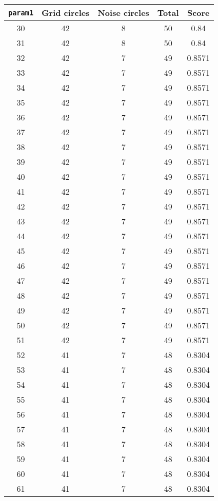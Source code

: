 \documentclass[letterpaper, 12pt]{article}
\begin{document}
\begin{longtable}{|c|c|c|c|c|}
\hline
\textbf{\texttt{param1}} & \textbf{Grid circles} & \textbf{Noise circles} & \textbf{Total} & \textbf{Score} \\
\hline
30 & 42 & 8 & 50 & 0.84 \\
\hline
31 & 42 & 8 & 50 & 0.84 \\
\hline
32 & 42 & 7 & 49 & 0.8571 \\
\hline
33 & 42 & 7 & 49 & 0.8571 \\
\hline
34 & 42 & 7 & 49 & 0.8571 \\
\hline
35 & 42 & 7 & 49 & 0.8571 \\
\hline
36 & 42 & 7 & 49 & 0.8571 \\
\hline
37 & 42 & 7 & 49 & 0.8571 \\
\hline
38 & 42 & 7 & 49 & 0.8571 \\
\hline
39 & 42 & 7 & 49 & 0.8571 \\
\hline
40 & 42 & 7 & 49 & 0.8571 \\
\hline
41 & 42 & 7 & 49 & 0.8571 \\
\hline
42 & 42 & 7 & 49 & 0.8571 \\
\hline
43 & 42 & 7 & 49 & 0.8571 \\
\hline
44 & 42 & 7 & 49 & 0.8571 \\
\hline
45 & 42 & 7 & 49 & 0.8571 \\
\hline
46 & 42 & 7 & 49 & 0.8571 \\
\hline
47 & 42 & 7 & 49 & 0.8571 \\
\hline
48 & 42 & 7 & 49 & 0.8571 \\
\hline
49 & 42 & 7 & 49 & 0.8571 \\
\hline
50 & 42 & 7 & 49 & 0.8571 \\
\hline
51 & 42 & 7 & 49 & 0.8571 \\
\hline
52 & 41 & 7 & 48 & 0.8304 \\
\hline
53 & 41 & 7 & 48 & 0.8304 \\
\hline
54 & 41 & 7 & 48 & 0.8304 \\
\hline
55 & 41 & 7 & 48 & 0.8304 \\
\hline
56 & 41 & 7 & 48 & 0.8304 \\
\hline
57 & 41 & 7 & 48 & 0.8304 \\
\hline
58 & 41 & 7 & 48 & 0.8304 \\
\hline
59 & 41 & 7 & 48 & 0.8304 \\
\hline
60 & 41 & 7 & 48 & 0.8304 \\
\hline
61 & 41 & 7 & 48 & 0.8304 \\

\end{longtable}
\end{document}
